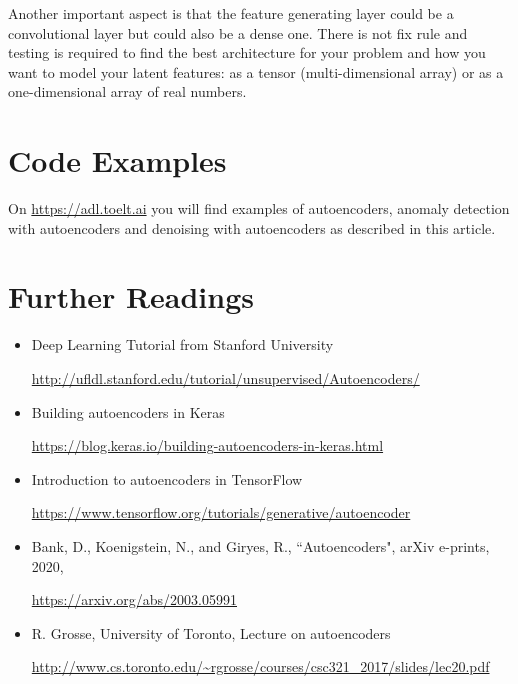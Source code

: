 \documentclass[12pt,a4]{article}
\begin{document}
Another important aspect is that the feature generating layer could be a convolutional layer but could also be a dense one. There is not fix rule and testing is required to find the best architecture for your problem and how you want to model your latent features: as a tensor (multi-dimensional array) or as a one-dimensional array of real numbers.

\section{Code Examples}

On \url{https://adl.toelt.ai} you will find examples of autoencoders, anomaly detection with autoencoders and denoising with autoencoders as described in this article.


\section{Further Readings}

\begin{itemize}
\item Deep Learning Tutorial from Stanford University

\url{http://ufldl.stanford.edu/tutorial/unsupervised/Autoencoders/} 


\item Building autoencoders in Keras

\url{https://blog.keras.io/building-autoencoders-in-keras.html}


\item Introduction to autoencoders in TensorFlow

\url{https://www.tensorflow.org/tutorials/generative/autoencoder}


\item Bank, D., Koenigstein, N., and Giryes, R., ``Autoencoders", arXiv e-prints, 2020,

\url{https://arxiv.org/abs/2003.05991} 


\item R. Grosse, University of Toronto, Lecture on autoencoders

\url{http://www.cs.toronto.edu/~rgrosse/courses/csc321_2017/slides/lec20.pdf} 
\end{itemize}
\end{document}
